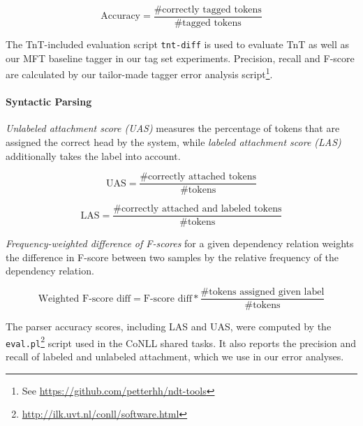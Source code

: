 \documentclass[a4paper,12pt,english]{book}
\begin{document}
\begin{equation*}
    \text{Accuracy} = \frac{\text{\# correctly tagged tokens}}{\text{\# tagged
            tokens}}
\end{equation*}

\vspace{1ex}

The TnT-included evaluation script \texttt{tnt-diff} is used to evaluate TnT as
well as our MFT baseline tagger in our tag set experiments. Precision, recall
and F-score are calculated by our tailor-made tagger error analysis
script\footnote{See \url{https://github.com/petterhh/ndt-tools}}.

\paragraph{Syntactic Parsing}
\emph{Unlabeled attachment score (UAS)} measures the percentage of tokens that
are assigned the correct head by the system, while \emph{labeled attachment
    score (LAS)} additionally takes the label into account.

\begin{equation*}
    \text{UAS} = \frac{\text{\# correctly attached tokens}}{\text{\# tokens}}
\end{equation*}

\vspace{1ex}

\begin{equation*}
    \text{LAS} = \frac{\text{\# correctly attached and labeled
            tokens}}{\text{\# tokens}}
\end{equation*}

\vspace{1ex}

\emph{Frequency-weighted difference of F-scores} for a given dependency
relation weights the difference in F-score between two samples by the relative
frequency of the dependency relation.

\begin{equation*}
    \text{Weighted F-score diff} = \text{F-score diff}*\frac{\text{\# tokens
            assigned given label}}{\text{\# tokens}}
\end{equation*}

\vspace{1ex}

The parser accuracy scores, including LAS and UAS, were computed by the
\texttt{eval.pl}\footnote{\url{http://ilk.uvt.nl/conll/software.html}} script
used in the CoNLL shared tasks. It also reports the precision and recall of
labeled and unlabeled attachment, which we use in our error analyses.
\end{document}
